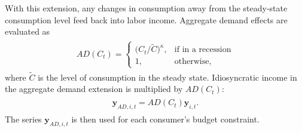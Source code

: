 \documentclass[\PathToRoot/\ProjectName]{subfiles}
\begin{document}
With this extension, any changes in consumption away from the steady-state consumption level feed back into labor income.
Aggregate demand effects are evaluated as
\begin{equation}
  \begin{gathered}
    \begin{aligned}
      AD(C_t) =   \begin{cases}
                    \Big(C_t/\tilde{C}\Big)^\kappa, & \text{if in a recession} \\
                    1,                              & \text{otherwise} ,
                  \end{cases}
    \end{aligned}
  \end{gathered}
\end{equation}
where $\tilde{C}$ is the level of consumption in the steady state.
Idiosyncratic income in the aggregate demand extension is multiplied by $AD(C_t)$:
\begin{equation}
  \begin{gathered}
    \begin{aligned}
      \mathbf{y}_{AD,i,t} = AD(C_t)\mathbf{y}_{i,t}.
    \end{aligned}
  \end{gathered}
\end{equation}
The series $\mathbf{y}_{AD,i,t}$ is then used for each consumer's budget constraint.

\smartbib

\pdfonly{
  \captionsetup[figure]{list=no}
  \captionsetup[table]{list=no}
}
\end{document}
